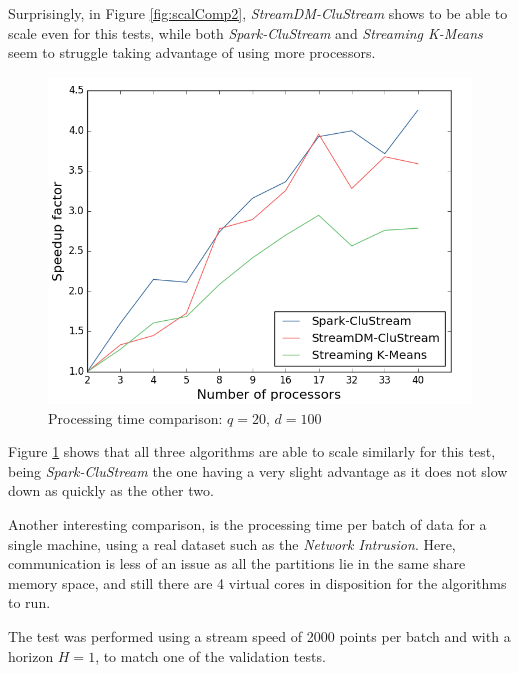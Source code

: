 Surprisingly, in Figure \ref{fig:scalComp2}, \textit{StreamDM-CluStream} shows to be able to scale even for this tests, while both \textit{Spark-CluStream} and \textit{Streaming K-Means} seem to struggle taking advantage of using more processors.

\begin{figure}[h!]
 \centering
 \includegraphics[scale=0.47]{./styles/scalComp100.png}
 \caption{Processing time comparison: $q=20$, $d=100$}
 \label{fig:scalComp100}
\end{figure}

Figure \ref{fig:scalComp100} shows that all three algorithms are able to scale similarly for this test, being \textit{Spark-CluStream} the one having a very slight advantage as it does not slow down as quickly as the other two.



Another interesting comparison, is the processing time per batch of data for a single machine, using a real dataset such as the \textit{Network Intrusion}. Here, communication is less of an issue as all the partitions lie in the same share memory space, and still there are 4 virtual cores in disposition for the algorithms to run. 

The test was performed using a stream speed of 2000 points per batch and with a horizon $H=1$, to match one of the validation tests.

